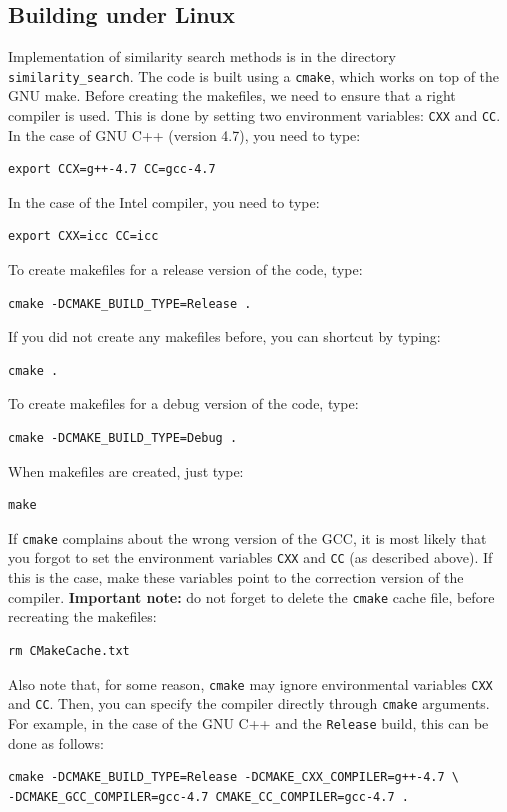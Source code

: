 \documentclass[runningheads,a4paper]{llncs}
\newcommand{\ttt}[1]{\texttt{#1}}
\begin{document}
{\subsection{Building under Linux}\label{SectionBuildLinux}
Implementation of similarity search methods is in the directory \ttt{similarity\_search}.
The code is built using a \ttt{cmake}, which works on top of the GNU make.
Before creating the makefiles, we need to ensure that a right compiler is used.
This is done by setting two environment variables: \ttt{CXX} and \ttt{CC}.
In the case of GNU C++ (version 4.7), you need to type:
\begin{verbatim}
export CCX=g++-4.7 CC=gcc-4.7 
\end{verbatim}
In the case of the Intel compiler, you need to type:
\begin{verbatim}
export CXX=icc CC=icc 
\end{verbatim}


To create makefiles for a release version of the code, type:
\begin{verbatim}
cmake -DCMAKE_BUILD_TYPE=Release .
\end{verbatim}
If you did not create any makefiles before, you can shortcut by typing:
\begin{verbatim}
cmake . 
\end{verbatim}
To create makefiles for a debug version of the code, type:
\begin{verbatim}
cmake -DCMAKE_BUILD_TYPE=Debug .
\end{verbatim}
When makefiles are created, just type:
\begin{verbatim}
make
\end{verbatim}
If \ttt{cmake} complains about the wrong version of the GCC, 
it is most likely that you forgot to set the environment variables \ttt{CXX} and \ttt{CC} (as described above).
If this is the case, make these variables point to the correction version of the compiler.
\textbf{Important note:} 
do not forget to delete the \ttt{cmake} cache file, before recreating the makefiles:
\begin{verbatim}
rm CMakeCache.txt
\end{verbatim}

Also note that, for some reason, \ttt{cmake} may ignore environmental variables \ttt{CXX} and \ttt{CC}.
Then, you can specify the compiler directly through \ttt{cmake} arguments.
For example, in the case of the GNU C++ and the \ttt{Release} build, 
this can be done as follows:
\begin{verbatim}
cmake -DCMAKE_BUILD_TYPE=Release -DCMAKE_CXX_COMPILER=g++-4.7 \
-DCMAKE_GCC_COMPILER=gcc-4.7 CMAKE_CC_COMPILER=gcc-4.7 .
\end{verbatim} 

}
\end{document}
